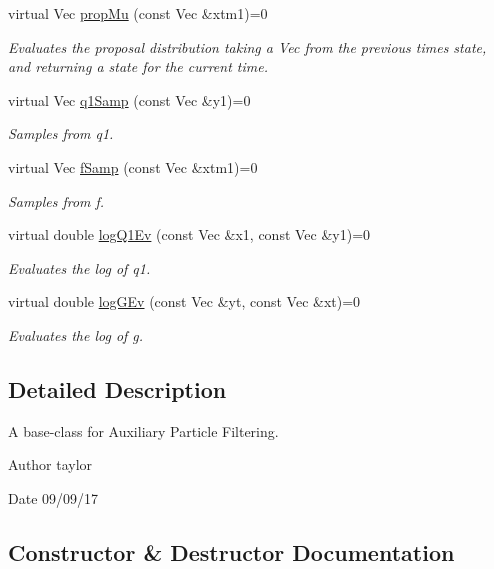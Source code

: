 \begin{DoxyCompactItemize}
virtual Vec \hyperlink{classAPFFilter_a2c136104f4d96e6481406ef1397ead51}{prop\+Mu} (const Vec \&xtm1)=0
\begin{DoxyCompactList}\small\item\em Evaluates the proposal distribution taking a Vec from the previous time\textquotesingle{}s state, and returning a state for the current time. \end{DoxyCompactList}\item 
virtual Vec \hyperlink{classAPFFilter_a017be49a493263156ae60ccc424f7daa}{q1\+Samp} (const Vec \&y1)=0
\begin{DoxyCompactList}\small\item\em Samples from q1. \end{DoxyCompactList}\item 
virtual Vec \hyperlink{classAPFFilter_a367c77209129a84f3d64ff3bcaaac513}{f\+Samp} (const Vec \&xtm1)=0
\begin{DoxyCompactList}\small\item\em Samples from f. \end{DoxyCompactList}\item 
virtual double \hyperlink{classAPFFilter_a18ba363183c0c92e6c58d6f3faccbea7}{log\+Q1\+Ev} (const Vec \&x1, const Vec \&y1)=0
\begin{DoxyCompactList}\small\item\em Evaluates the log of q1. \end{DoxyCompactList}\item 
virtual double \hyperlink{classAPFFilter_ac2d0b5329d7ae123ae4de5dddefb5591}{log\+G\+Ev} (const Vec \&yt, const Vec \&xt)=0
\begin{DoxyCompactList}\small\item\em Evaluates the log of g. \end{DoxyCompactList}\end{DoxyCompactItemize}


\subsection{Detailed Description}
A base-\/class for Auxiliary Particle Filtering. 

\begin{DoxyAuthor}{Author}
taylor 
\end{DoxyAuthor}
\begin{DoxyDate}{Date}
09/09/17 
\end{DoxyDate}


\subsection{Constructor \& Destructor Documentation}
